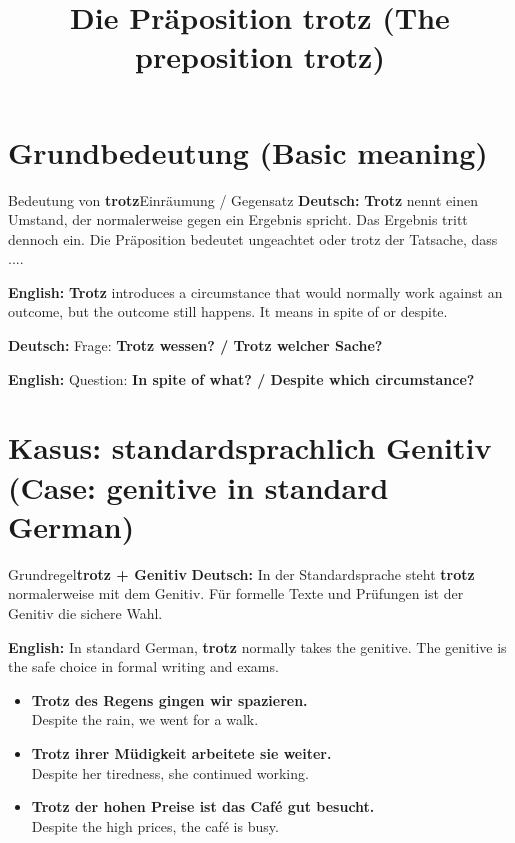 \documentclass[a4paper,11pt]{article}
\title{Die Präposition \glqq trotz\grqq{} \textnormal{(The preposition \glqq trotz\grqq)}}
\date{}
\newcommand{\GermanText}[1]{\textbf{Deutsch: }#1\par}
\newcommand{\EnglishText}[1]{{\small\color{SoftGray}\textbf{English: }#1\par}}
\newcommand{\ExampleItem}[2]{\item \textbf{#1}\\{\small\color{SoftGray}#2}}
\begin{document}
\maketitle
\tableofcontents
\newpage

\section{Grundbedeutung \textnormal{(Basic meaning)}}
\begin{grammarentry}{Bedeutung von \textbf{trotz}}{Einräumung / Gegensatz}
\GermanText{\textbf{Trotz} nennt einen Umstand, der normalerweise gegen ein Ergebnis spricht. Das Ergebnis tritt dennoch ein. Die Präposition bedeutet \glqq ungeachtet\grqq{} oder \glqq trotz der Tatsache, dass ...\grqq.}
\EnglishText{\textbf{Trotz} introduces a circumstance that would normally work against an outcome, but the outcome still happens. It means \glqq in spite of\grqq{} or \glqq despite\grqq.}
\GermanText{Frage: \textbf{Trotz wessen? / Trotz welcher Sache?}}
\EnglishText{Question: \textbf{In spite of what? / Despite which circumstance?}}
\end{grammarentry}

\section{Kasus: standardsprachlich Genitiv \textnormal{(Case: genitive in standard German)}}
\begin{grammarentry}{Grundregel}{\textbf{trotz + Genitiv}}
\GermanText{In der Standardsprache steht \textbf{trotz} normalerweise mit dem Genitiv. Für formelle Texte und Prüfungen ist der Genitiv die sichere Wahl.}
\EnglishText{In standard German, \textbf{trotz} normally takes the genitive. The genitive is the safe choice in formal writing and exams.}
\end{grammarentry}
\begin{exbox}
\begin{itemize}
\ExampleItem{Trotz des Regens gingen wir spazieren.}{Despite the rain, we went for a walk.}
\ExampleItem{Trotz ihrer Müdigkeit arbeitete sie weiter.}{Despite her tiredness, she continued working.}
\ExampleItem{Trotz der hohen Preise ist das Café gut besucht.}{Despite the high prices, the café is busy.}
\end{itemize}
\end{exbox}
\end{document}
